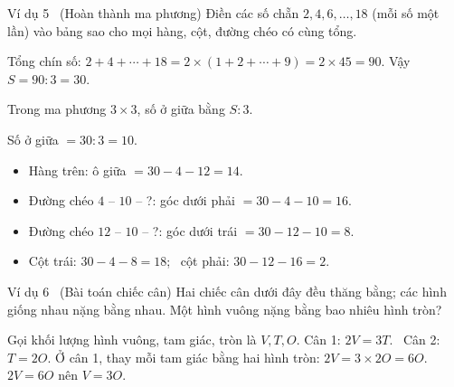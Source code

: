 \begin{exbox}{Ví dụ 5 \ (Hoàn thành ma phương)}
Điền các số chẵn $2, 4, 6, \ldots, 18$ (mỗi số một lần) vào bảng sao cho mọi hàng, cột, đường chéo có cùng tổng.
\begin{center}\end{center}
\guide
{}
Tổng chín số: $2 + 4 + \cdots + 18 = 2\times(1 + 2 + \cdots + 9) = 2\times 45 = 90$. Vậy $S = 90 : 3 = 30$.
\begin{recallbox}Trong ma phương $3\times 3$, số ở giữa bằng $S : 3$.\end{recallbox}
Số ở giữa $= 30 : 3 = 10$.
\begin{itemize}[leftmargin=1.4em,itemsep=0pt,topsep=1pt]
\item Hàng trên: ô giữa $= 30 - 4 - 12 = 14$.
\item Đường chéo $4$ -- $10$ -- ?: góc dưới phải $= 30 - 4 - 10 = 16$.
\item Đường chéo $12$ -- $10$ -- ?: góc dưới trái $= 30 - 12 - 10 = 8$.
\item Cột trái: $30 - 4 - 8 = 18$; \ cột phải: $30 - 12 - 16 = 2$.
\end{itemize}
\begin{center}\end{center}
\end{exbox}

\begin{exbox}{Ví dụ 6 \ (Bài toán chiếc cân)}
Hai chiếc cân dưới đây đều thăng bằng; các hình giống nhau nặng bằng nhau. Một hình vuông nặng bằng bao nhiêu hình tròn?
\begin{center}
\lgaScale{\lgaSq\,\lgaSq}{\lgaTri\,\lgaTri\,\lgaTri}\hspace{1cm}\lgaScale{\lgaTri}{\lgaCir\,\lgaCir}
\end{center}
\guide
{}
Gọi khối lượng hình vuông, tam giác, tròn là $V, T, O$. Cân 1: $2V = 3T$. \ Cân 2: $T = 2O$.
Ở cân 1, thay mỗi tam giác bằng hai hình tròn: $2V = 3\times 2O = 6O$.
$2V = 6O$ nên $V = 3O$.
\end{exbox}

